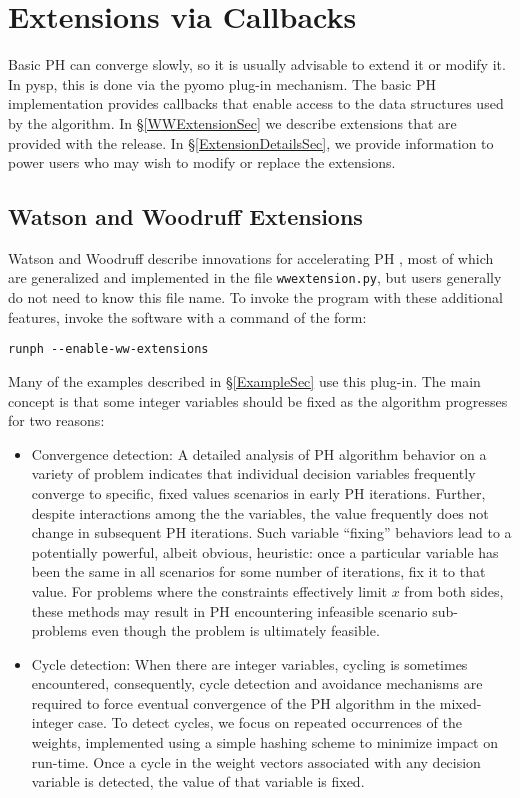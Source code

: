 \section{Extensions via Callbacks \label{CallbackSec}}

Basic PH can converge slowly, so it is usually advisable to extend it or modify
it. In pysp, this is done via the pyomo plug-in mechanism. The basic PH
implementation provides callbacks that enable access to the data structures used
by the algorithm. In \S\ref{WWExtensionSec} we describe extensions that are
provided with the release. In \S\ref{ExtensionDetailsSec}, we provide
information to power users who may wish to modify or replace the extensions.

\subsection{Watson and Woodruff Extensions \label{WWExtensionSec}}

Watson and Woodruff describe innovations for accelerating PH \cite{phinnovate},
most of which are generalized and implemented in the file \verb|wwextension.py|,
but users generally do not need to know this file name. To invoke the program
with these additional features, invoke the software with a command of the form:

\begin{verbatim}
runph --enable-ww-extensions
\end{verbatim}

Many of the examples described in \S\ref{ExampleSec} use this plug-in. The main
concept is that some integer variables should be fixed as the algorithm
progresses for two reasons:

\begin{itemize}
  \item Convergence detection: A detailed analysis of PH algorithm behavior on a
  variety of problem indicates that individual decision variables frequently
  converge to specific, fixed values scenarios in early PH iterations. Further,
  despite interactions among the the variables, the value frequently does not
  change in subsequent PH iterations. Such variable ``fixing'' behaviors lead to
  a potentially powerful, albeit obvious, heuristic: once a particular variable
  has been the same in all scenarios for some number of iterations, fix it to
  that value. For problems where the constraints effectively limit $x$ from both
  sides, these methods may result in PH encountering infeasible scenario
  sub-problems even though the problem is ultimately feasible.

  \item Cycle detection: When there are integer variables, cycling is sometimes
  encountered, consequently, cycle detection and avoidance mechanisms are
  required to force eventual convergence of the PH algorithm in the
  mixed-integer case. To detect cycles, we focus on repeated occurrences of the
  weights, implemented using a simple hashing scheme \cite{tabuhash} to minimize
  impact on run-time. Once a cycle in the weight vectors associated with any
  decision variable is detected, the value of that variable is fixed.
\end{itemize}

